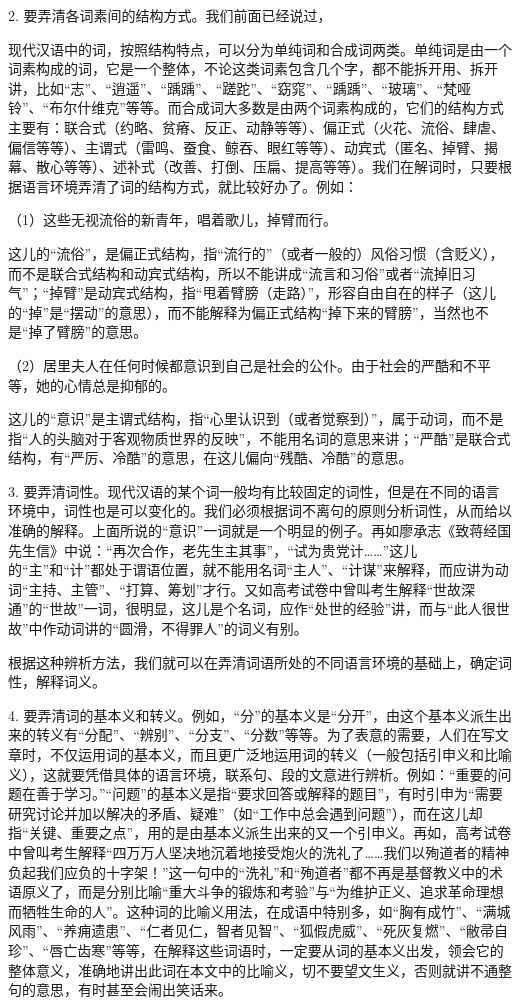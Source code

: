 2. 要弄清各词素间的结构方式。我们前面已经说过，

现代汉语中的词，按照结构特点，可以分为单纯词和合成词两类。单纯词是由一个词素构成的词，它是一个整体，不论这类词素包含几个字，都不能拆开用、拆开讲，比如“志”、“逍遥”、“踽踽”、“蹉跎”、“窈窕”、“踽踽”、“玻璃”、“梵哑铃”、“布尔什维克”等等。而合成词大多数是由两个词素构成的，它们的结构方式主要有：联合式（约略、贫瘠、反正、动静等等）、偏正式（火花、流俗、肆虐、偏信等等）、主谓式（雷鸣、蚕食、鲸吞、眼红等等）、动宾式（匿名、掉臂、揭幕、散心等等）、述补式（改善、打倒、压扁、提高等等）。我们在解词时，只要根据语言环境弄清了词的结构方式，就比较好办了。例如：

（1）这些无视流俗的新青年，唱着歌儿，掉臂而行。

这儿的“流俗”，是偏正式结构，指“流行的”（或者一般的）风俗习惯（含贬义），而不是联合式结构和动宾式结构，所以不能讲成“流言和习俗”或者“流掉旧习气”；“掉臂”是动宾式结构，指“甩着臂膀（走路）”，形容自由自在的样子（这儿的“掉”是“摆动”的意思），而不能解释为偏正式结构“掉下来的臂膀”，当然也不是“掉了臂膀”的意思。

（2）居里夫人在任何时候都意识到自己是社会的公仆。由于社会的严酷和不平等，她的心情总是抑郁的。

这儿的“意识”是主谓式结构，指“心里认识到（或者觉察到）”，属于动词，而不是指“人的头脑对于客观物质世界的反映”，不能用名词的意思来讲；“严酷”是联合式结构，有“严厉、冷酷”的意思，在这儿偏向“残酷、冷酷”的意思。

3. 要弄清词性。现代汉语的某个词一般均有比较固定的词性，但是在不同的语言环境中，词性也是可以变化的。我们必须根据词不离句的原则分析词性，从而给以准确的解释。上面所说的“意识”一词就是一个明显的例子。再如廖承志《致蒋经国先生信》中说：“再次合作，老先生主其事”，“试为贵党计……”这儿的“主”和“计”都处于谓语位置，就不能用名词“主人”、“计谋”来解释，而应讲为动词“主持、主管”、“打算、筹划”才行。又如高考试卷中曾叫考生解释“世故深通”的“世故”一词，很明显，这儿是个名词，应作“处世的经验”讲，而与“此人很世故”中作动词讲的“圆滑，不得罪人”的词义有别。

根据这种辨析方法，我们就可以在弄清词语所处的不同语言环境的基础上，确定词性，解释词义。

4. 要弄清词的基本义和转义。例如，“分”的基本义是“分开”，由这个基本义派生出来的转义有“分配”、“辨别”、“分支”、“分数”等等。为了表意的需要，人们在写文章时，不仅运用词的基本义，而且更广泛地运用词的转义（一般包括引申义和比喻义），这就要凭借具体的语言环境，联系句、段的文意进行辨析。例如：“重要的问题在善于学习。”“问题”的基本义是指“要求回答或解释的题目”，有时引申为“需要研究讨论并加以解决的矛盾、疑难”（如“工作中总会遇到问题”），而在这儿却指“关键、重要之点”，用的是由基本义派生出来的又一个引申义。再如，高考试卷中曾叫考生解释“四万万人坚决地沉着地接受炮火的洗礼了……我们以殉道者的精神负起我们应负的十字架！”这一句中的“洗礼”和“殉道者”都不再是基督教义中的术语原义了，而是分别比喻“重大斗争的锻炼和考验”与“为维护正义、追求革命理想而牺牲生命的人”。这种词的比喻义用法，在成语中特别多，如“胸有成竹”、“满城风雨”、“养痈遗患”、“仁者见仁，智者见智”、“狐假虎威”、“死灰复燃”、“敝帚自珍”、“唇亡齿寒”等等，在解释这些词语时，一定要从词的基本义出发，领会它的整体意义，准确地讲出此词在本文中的比喻义，切不要望文生义，否则就讲不通整句的意思，有时甚至会闹出笑话来。


